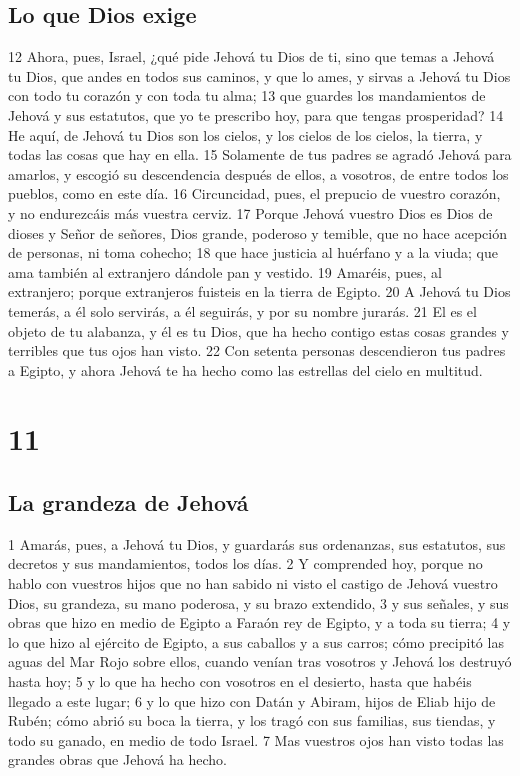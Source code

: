 \section{Lo que Dios exige}

12 Ahora, pues, Israel, ¿qué pide Jehová tu Dios de ti, sino que temas a Jehová tu Dios, que andes en todos sus caminos, y que lo ames, y sirvas a Jehová tu Dios con todo tu corazón y con toda tu alma;
13 que guardes los mandamientos de Jehová y sus estatutos, que yo te prescribo hoy, para que tengas prosperidad?
14 He aquí, de Jehová tu Dios son los cielos, y los cielos de los cielos, la tierra, y todas las cosas que hay en ella.
15 Solamente de tus padres se agradó Jehová para amarlos, y escogió su descendencia después de ellos, a vosotros, de entre todos los pueblos, como en este día.
16 Circuncidad, pues, el prepucio de vuestro corazón, y no endurezcáis más vuestra cerviz.
17 Porque Jehová vuestro Dios es Dios de dioses y Señor de señores, Dios grande, poderoso y temible, que no hace acepción de personas, ni toma cohecho;
18 que hace justicia al huérfano y a la viuda; que ama también al extranjero dándole pan y vestido.
19 Amaréis, pues, al extranjero; porque extranjeros fuisteis en la tierra de Egipto.
20 A Jehová tu Dios temerás, a él solo servirás, a él seguirás, y por su nombre jurarás.
21 El es el objeto de tu alabanza, y él es tu Dios, que ha hecho contigo estas cosas grandes y terribles que tus ojos han visto.
22 Con setenta personas descendieron tus padres a Egipto, y ahora Jehová te ha hecho como las estrellas del cielo en multitud.

\chapter{11}

\section{La grandeza de Jehová}

1 Amarás, pues, a Jehová tu Dios, y guardarás sus ordenanzas, sus estatutos, sus decretos y sus mandamientos, todos los días.
2 Y comprended hoy, porque no hablo con vuestros hijos que no han sabido ni visto el castigo de Jehová vuestro Dios, su grandeza, su mano poderosa, y su brazo extendido,
3 y sus señales, y sus obras que hizo en medio de Egipto a Faraón rey de Egipto, y a toda su tierra;
4 y lo que hizo al ejército de Egipto, a sus caballos y a sus carros; cómo precipitó las aguas del Mar Rojo sobre ellos, cuando venían tras vosotros y Jehová los destruyó hasta hoy;
5 y lo que ha hecho con vosotros en el desierto, hasta que habéis llegado a este lugar;
6 y lo que hizo con Datán y Abiram, hijos de Eliab hijo de Rubén; cómo abrió su boca la tierra, y los tragó con sus familias, sus tiendas, y todo su ganado, en medio de todo Israel.
7 Mas vuestros ojos han visto todas las grandes obras que Jehová ha hecho.

